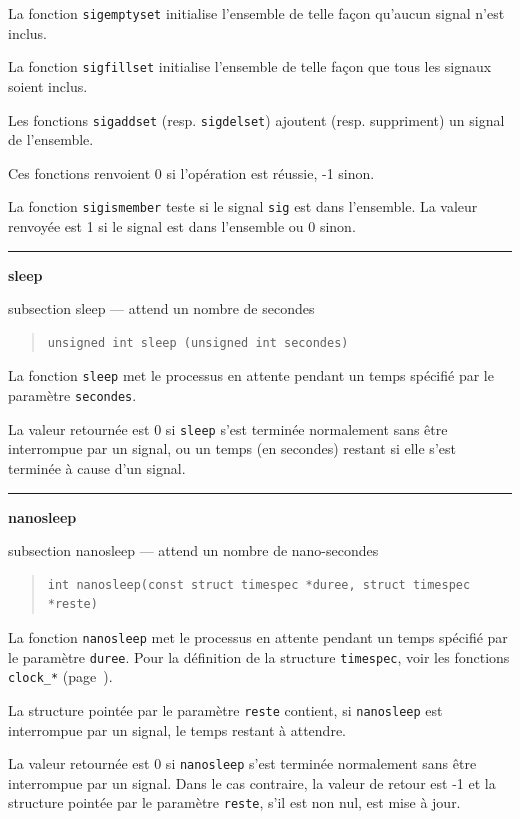 \documentclass [twoside] {report}
\newcommand {\primitive} [1]
    {
	\phantomsection
	{\large \textbf {#1}}
	\addcontentsline {toc} {subsection} {#1}
    }
\newcommand {\separation}
    {
	\vspace {5mm}
	\nopagebreak
	\hrule
    }
\begin{document}
La fonction \texttt {sigemptyset} initialise l'ensemble de telle façon
qu'aucun signal n'est inclus.

La fonction \texttt {sigfillset} initialise l'ensemble de telle façon que
tous les signaux soient inclus.

Les fonctions \texttt {sigaddset} (resp. \texttt {sigdelset}) ajoutent
(resp. suppriment) un signal de l'ensemble.

Ces fonctions renvoient 0 si l'opération est réussie, -1 sinon.

La fonction \texttt {sigismember} teste si le signal \texttt {sig} est dans
l'ensemble. La valeur renvoyée est 1 si le signal est dans l'ensemble
ou 0 sinon.



\separation 
\primitive {sleep} --- attend un nombre de secondes

\begin {quote}
\begin {verbatim}
unsigned int sleep (unsigned int secondes)
\end{verbatim}
\end {quote}

La fonction \texttt {sleep} met le processus en attente pendant un temps
spécifié par le paramètre \texttt {secondes}.

La valeur retournée est 0 si \texttt {sleep} s'est terminée normalement sans
être interrompue par un signal, ou un temps (en secondes) restant
si elle s'est terminée à cause d'un signal.


\separation 
\primitive {nanosleep} --- attend un nombre de nano-secondes

\begin {quote}
\begin {verbatim}
int nanosleep(const struct timespec *duree, struct timespec *reste)
\end{verbatim}
\end {quote}

La fonction \texttt {nanosleep} met le processus en attente pendant un
temps spécifié par le paramètre \texttt {duree}. Pour la définition de
la structure \texttt {timespec}, voir les fonctions \texttt {clock\_*}
(page~\pageref {clockgettime}).  

La structure pointée par le paramètre \texttt {reste} contient, si
\texttt {nanosleep} est interrompue par un signal, le temps restant
à attendre.

La valeur retournée est 0 si \texttt {nanosleep} s'est terminée normalement
sans être interrompue par un signal. Dans le cas contraire, la valeur de
retour est -1 et la structure pointée par le paramètre \texttt {reste},
s'il est non nul, est mise à jour.
\end{document}
